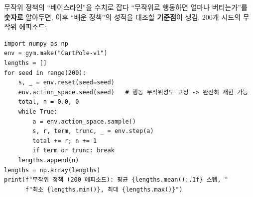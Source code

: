 \begin{frame}[fragile]{무작위 정책의 ``베이스라인''을 수치로 잡다}
  ``무작위로 행동하면 얼마나 버티는가''를 \textbf{숫자로} 알아두면,
  이후 ``배운 정책''의 성적을 대조할 \textbf{기준점}이 생김.
  200개 시드의 무작위 에피소드:
\begin{lstlisting}
import numpy as np
env = gym.make("CartPole-v1")
lengths = []
for seed in range(200):
    s, _ = env.reset(seed=seed)
    env.action_space.seed(seed)   # 행동 무작위성도 고정 -> 완전히 재현 가능
    total, n = 0.0, 0
    while True:
        a = env.action_space.sample()
        s, r, term, trunc, _ = env.step(a)
        total += r; n += 1
        if term or trunc: break
    lengths.append(n)
lengths = np.array(lengths)
print(f"무작위 정책 (200 에피소드): 평균 {lengths.mean():.1f} 스텝, "
      f"최소 {lengths.min()}, 최대 {lengths.max()}")
\end{lstlisting}
\end{frame}
